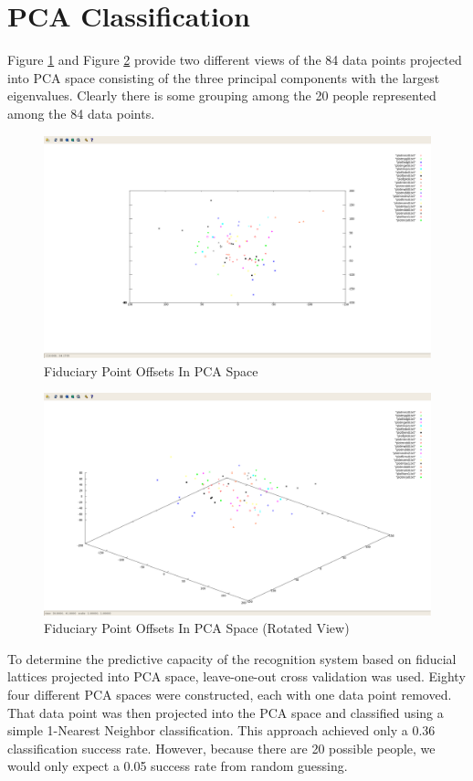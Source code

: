 \documentclass[12pt]{article}
\begin{document}
\section{PCA Classification}

Figure \ref{pca1} and Figure \ref{pca2} provide two different views of the 84 data points projected into PCA space consisting of the three principal components with the largest eigenvalues. Clearly there is some grouping among the 20 people represented among the 84 data points.

\begin{figure}
\centering
\includegraphics[width=1.00\textwidth]{problem1-fid-pca-1.png}
\caption{Fiduciary Point Offsets In PCA Space}
\label{pca1}
\end{figure}

\begin{figure}
\centering
\includegraphics[width=1.00\textwidth]{problem1-fid-pca-2.png}
\caption{Fiduciary Point Offsets In PCA Space (Rotated View)}
\label{pca2}
\end{figure}

To determine the predictive capacity of the recognition system based on fiducial lattices projected into PCA space, leave-one-out cross validation was used. Eighty four different PCA spaces were constructed, each with one data point removed. That data point was then projected into the PCA space and classified using a simple 1-Nearest Neighbor classification. This approach achieved only a 0.36 classification success rate. However, because there are 20 possible people, we would only expect a 0.05 success rate from random guessing.
\end{document}
